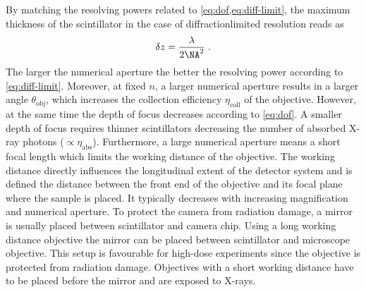 \documentclass[
twoside,
openright,
titlepage,
numbers=noenddot,
headinclude,
fleqn,
a4paper,
footinclude=true,
cleardoublepage=empty,
abstractoff,
BCOR=5mm,
paper=a4,
fontsize=11pt,
british,ngerman,american,
]{scrreprt}
\begin{document}
By matching the resolving powers related to
\cref{eq:dof,eq:diff-limit}, the maximum thickness of the scintillator
in the case of diffraction\hyph limited resolution reads as
\begin{equation}
  \label{eq:dof2}
  \delta z = \frac{\lambda}{2\NA^2}\;.
\end{equation}
The larger the numerical aperture the better the resolving power
according to \cref{eq:diff-limit}.  Moreover, at fixed $n$, a larger
numerical aperture results in a larger angle $\theta_{\mathrm{obj}}$,
which increases the collection efficiency $\eta_{\mathrm{coll}}$ of
the objective.  However, at the same time the depth of focus decreases
according to \cref{eq:dof}.  A smaller depth of focus requires thinner
scintillators decreasing the number of absorbed X-ray photons
($\propto\eta_{\mathrm{abs}}$).  Furthermore, a large numerical
aperture means a short focal length which limits the working distance
of the objective.  The working distance directly influences the
longitudinal extent of the detector system and is defined the distance
between the front end of the objective and its focal plane where the
sample is placed.  It typically decreases with increasing
magnification and numerical aperture.  To protect the camera from
radiation damage, a mirror is usually placed between scintillator and
camera chip.  Using a long working distance objective the mirror can
be placed between scintillator and microscope objective.  This setup
is favourable for high-dose experiments since the objective is
protected from radiation damage.  Objectives with a short working
distance have to be placed before the mirror and are exposed to
X-rays.






\end{document}
